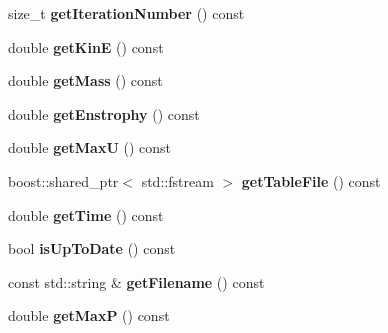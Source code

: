 \begin{DoxyCompactItemize}
\item 
\hypertarget{classnatrium_1_1SolverStats_acf824edde9e155f0c19c591179fed5eb}{
size\_\-t {\bfseries getIterationNumber} () const }
\label{classnatrium_1_1SolverStats_acf824edde9e155f0c19c591179fed5eb}

\item 
\hypertarget{classnatrium_1_1SolverStats_a24d2637fa64a779c0f01820ae7e0dfa6}{
double {\bfseries getKinE} () const }
\label{classnatrium_1_1SolverStats_a24d2637fa64a779c0f01820ae7e0dfa6}

\item 
\hypertarget{classnatrium_1_1SolverStats_a63d4c1478964175cb70b6bab4ad6da58}{
double {\bfseries getMass} () const }
\label{classnatrium_1_1SolverStats_a63d4c1478964175cb70b6bab4ad6da58}

\item 
\hypertarget{classnatrium_1_1SolverStats_a1da43f2bb7fbb734e3ec6c7eaa8d647a}{
double {\bfseries getEnstrophy} () const }
\label{classnatrium_1_1SolverStats_a1da43f2bb7fbb734e3ec6c7eaa8d647a}

\item 
\hypertarget{classnatrium_1_1SolverStats_ac880e86e2e93cafad88fa447ebb641b5}{
double {\bfseries getMaxU} () const }
\label{classnatrium_1_1SolverStats_ac880e86e2e93cafad88fa447ebb641b5}

\item 
\hypertarget{classnatrium_1_1SolverStats_ac1663800fe3d597f2727f0d938641381}{
boost::shared\_\-ptr$<$ std::fstream $>$ {\bfseries getTableFile} () const }
\label{classnatrium_1_1SolverStats_ac1663800fe3d597f2727f0d938641381}

\item 
\hypertarget{classnatrium_1_1SolverStats_a7eb7473ffe34d624bb8c09666021a6e8}{
double {\bfseries getTime} () const }
\label{classnatrium_1_1SolverStats_a7eb7473ffe34d624bb8c09666021a6e8}

\item 
\hypertarget{classnatrium_1_1SolverStats_ade0d711e048a834547ad32643bc2b529}{
bool {\bfseries isUpToDate} () const }
\label{classnatrium_1_1SolverStats_ade0d711e048a834547ad32643bc2b529}

\item 
\hypertarget{classnatrium_1_1SolverStats_aedf3ce8027cba3da15c8b28241234c94}{
const std::string \& {\bfseries getFilename} () const }
\label{classnatrium_1_1SolverStats_aedf3ce8027cba3da15c8b28241234c94}

\item 
\hypertarget{classnatrium_1_1SolverStats_a101f0b150f9bf2bf48ae6c4031f4c270}{
double {\bfseries getMaxP} () const }
\label{classnatrium_1_1SolverStats_a101f0b150f9bf2bf48ae6c4031f4c270}


\end{DoxyCompactItemize}

